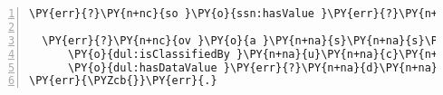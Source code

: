 \begin{Verbatim}[commandchars=\\\{\},numbers=left,firstnumber=1,stepnumber=1]
  \PY{err}{?}\PY{n+nc}{so }\PY{o}{ssn:hasValue }\PY{err}{?}\PY{n+na}{o}\PY{n+na}{v }.

  \PY{err}{?}\PY{n+nc}{ov }\PY{o}{a }\PY{n+na}{s}\PY{n+na}{s}\PY{n+na}{n}\PY{n+na}{:}\PY{n+na}{O}\PY{n+na}{b}\PY{n+na}{s}\PY{n+na}{e}\PY{n+na}{r}\PY{n+na}{v}\PY{n+na}{a}\PY{n+na}{t}\PY{n+na}{i}\PY{n+na}{o}\PY{n+na}{n}\PY{n+na}{V}\PY{n+na}{a}\PY{n+na}{l}\PY{n+na}{u}\PY{n+na}{e };
      \PY{o}{dul:isClassifiedBy }\PY{n+na}{u}\PY{n+na}{c}\PY{n+na}{u}\PY{n+na}{m}\PY{n+na}{:}\PY{n+na}{l}\PY{n+na}{u}\PY{n+na}{x };
      \PY{o}{dul:hasDataValue }\PY{err}{?}\PY{n+na}{d}\PY{n+na}{e}\PY{n+na}{s}\PY{n+na}{i}\PY{n+na}{r}\PY{n+na}{e}\PY{n+na}{d}\PY{n+na}{\PYZus{}}\PY{n+na}{v}\PY{n+na}{a}\PY{n+na}{l}\PY{n+na}{u}\PY{n+na}{e }.
\PY{err}{\PYZcb{}}\PY{err}{.}
\end{Verbatim}
